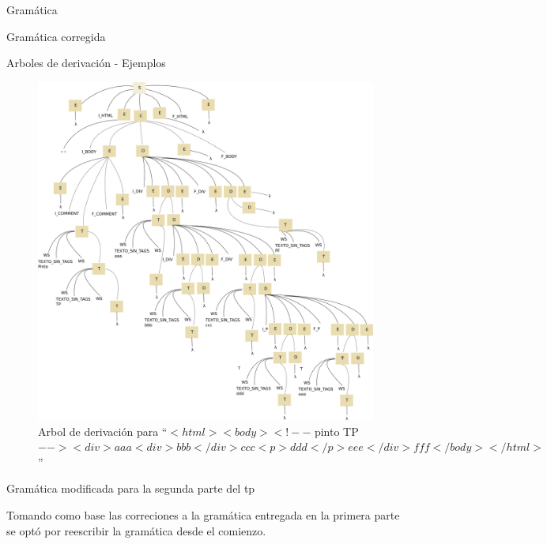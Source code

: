 \documentclass[a4paper,8pt]{article}
\begin{document}
\begin{section}{Gramática}
\begin{subsection}{Gramática corregida}
\begin{subsubsection}{Arboles de derivación - Ejemplos}
    \begin{figure}[h!]
      \centering
      \includegraphics[scale=0.35]{g5188.jpg}

      \caption{Arbol de derivación para ``$<html> <body><!--$ pinto TP $--> <div>aaa<div>bbb</div>ccc<p>ddd</p>eee</div>fff</body></html>$''}
    \end{figure}


 \end{subsubsection}

\end{subsection}
\newpage

\begin{subsection}{Gramática modificada para la segunda parte del tp}

Tomando como base las correciones a la gramática entregada en la primera parte se optó por reescribir la gramática desde el comienzo.\\


\end{subsection}
\end{section}
\end{document}
